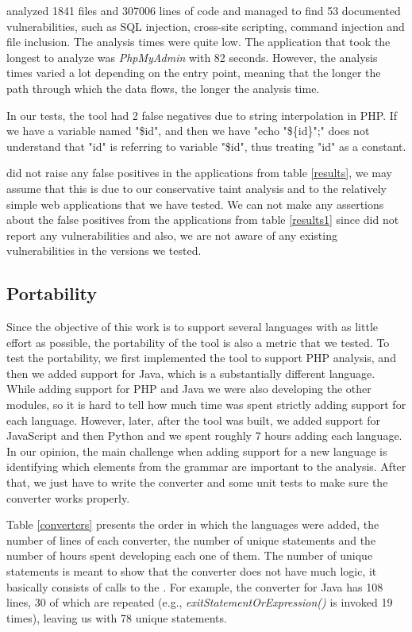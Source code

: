 \toolname{} analyzed 1841 files and 307006 lines of code and managed to find 53 documented vulnerabilities, such as SQL injection, cross-site scripting, command injection and file inclusion. The analysis times were quite low. The application that took the longest to analyze was \textit{PhpMyAdmin} with 82 seconds. However, the analysis times varied a lot depending on the entry point, meaning that the longer the path through which the data flows, the longer the analysis time.

In our tests, the tool had 2 false negatives due to string interpolation in PHP. If we have a variable named "\$id", and then we have "echo "\$\{id\}";" \toolname{} does not understand that "id" is referring to variable "\$id", thus treating "id" as a constant.




\toolname{} did not raise any false positives in the applications from table \ref{results}, we may assume that this is due to our conservative taint analysis and to the relatively simple web applications that we have tested. We can not make any assertions about the false positives from the applications from table \ref{results1} since \toolname{} did not report any vulnerabilities and also, we are not aware of any existing vulnerabilities in the versions we tested.




\subsection{Portability}

Since the objective of this work is to support several languages with as little effort as possible, the portability of the tool is also a metric that we tested. To test the portability, we first implemented the tool to support PHP analysis, and then we added support for Java, which is a substantially different language. While adding support for PHP and Java we were also developing the other modules, so it is hard to tell how much time was spent strictly adding support for each language. However, later, after the tool was built, we added support for JavaScript and then Python and we spent roughly 7 hours adding each language. In our opinion, the main challenge when adding support for a new language is identifying which elements from the grammar are important to the analysis. After that, we just have to  write the converter and some unit tests to make sure the converter works properly.

Table \ref{converters} presents the order in which the languages were added, the number of lines of each converter, the number of unique statements and the number of hours spent developing each one of them.
The number of unique statements is meant to show that the converter does not have much logic, it basically consists of calls to the \astbuilder{}. For example, the converter for Java has 108 lines, 30 of which are repeated (e.g., \textit{exitStatementOrExpression()} is invoked 19 times), leaving us with 78 unique statements.

